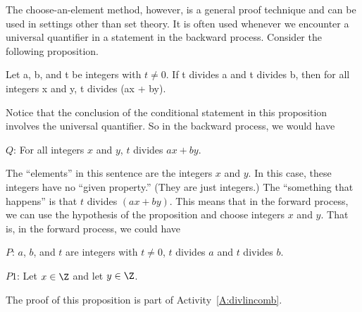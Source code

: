 The choose-an-element method, however, is a general proof technique and can be used in settings other than set theory.  It is often used whenever we encounter a universal quantifier in a statement in the backward process.  Consider the following proposition.
\begin{proposition} \label{P:divlinearcomb}
Let a, b, and  t  be integers with $t \ne 0$.  If  t  divides  a  and  t  divides  b, then for all integers  x  and  y,  t  divides  (ax + by).
\end{proposition}
%
Notice that the conclusion of the conditional statement in this proposition involves the universal quantifier.  So in the backward process, we would have
\begin{list}{}
\item $Q$:	For all integers  $x$  and  $y$, $t$  divides  $ax + by$.
\end{list}
\vskip10pt
%
The ``elements'' in this sentence are the integers  $x$  and  $y$.  In this case, these integers have no ``given property.''  (They are just integers.)  The ``something that happens'' is that 
$t$  divides  $\left(ax + by\right)$.  
%
This means that in the forward process, we can use the hypothesis of the proposition and choose integers  $x$  and  $y$.  That is, in the forward process, we could have
\begin{list}{}
\item $P$:	$a$, $b$, and  $t$  are integers with $t \ne 0$, $t$  divides  $a$  and  $t$  divides  $b$.
\item $P1$:	Let  $x \in \Z$ and let  $y \in \Z$.
\end{list}
\vskip10pt
%
\noindent
The proof of this proposition is part of Activity~\ref{A:divlincomb}.
\hbreak

